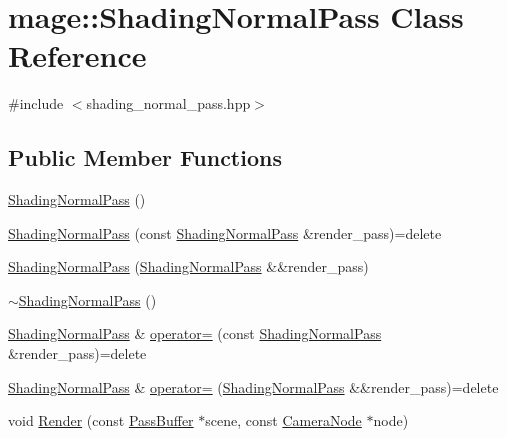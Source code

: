\hypertarget{classmage_1_1_shading_normal_pass}{}\section{mage\+:\+:Shading\+Normal\+Pass Class Reference}
\label{classmage_1_1_shading_normal_pass}


{\ttfamily \#include $<$shading\+\_\+normal\+\_\+pass.\+hpp$>$}

\subsection*{Public Member Functions}
\begin{DoxyCompactItemize}
\item 
\hyperlink{classmage_1_1_shading_normal_pass_a8d85834472875ce27cf3966b7c561d1f}{Shading\+Normal\+Pass} ()
\item 
\hyperlink{classmage_1_1_shading_normal_pass_ab13b45f9a3118f8494150d64ff06f94f}{Shading\+Normal\+Pass} (const \hyperlink{classmage_1_1_shading_normal_pass}{Shading\+Normal\+Pass} \&render\+\_\+pass)=delete
\item 
\hyperlink{classmage_1_1_shading_normal_pass_acc466f246daaf57ccace5aa8782f0799}{Shading\+Normal\+Pass} (\hyperlink{classmage_1_1_shading_normal_pass}{Shading\+Normal\+Pass} \&\&render\+\_\+pass)
\item 
\hyperlink{classmage_1_1_shading_normal_pass_aba7194077210d32dbcbc6cfbf4adba8f}{$\sim$\+Shading\+Normal\+Pass} ()
\item 
\hyperlink{classmage_1_1_shading_normal_pass}{Shading\+Normal\+Pass} \& \hyperlink{classmage_1_1_shading_normal_pass_afef400a6e3b00a43f6b6d3a3f34d43b7}{operator=} (const \hyperlink{classmage_1_1_shading_normal_pass}{Shading\+Normal\+Pass} \&render\+\_\+pass)=delete
\item 
\hyperlink{classmage_1_1_shading_normal_pass}{Shading\+Normal\+Pass} \& \hyperlink{classmage_1_1_shading_normal_pass_a25a9ba6a32a246176929f4de1a4adf0c}{operator=} (\hyperlink{classmage_1_1_shading_normal_pass}{Shading\+Normal\+Pass} \&\&render\+\_\+pass)=delete
\item 
void \hyperlink{classmage_1_1_shading_normal_pass_ac4c404dd4b54fee222f652c1556fb9bf}{Render} (const \hyperlink{structmage_1_1_pass_buffer}{Pass\+Buffer} $\ast$scene, const \hyperlink{classmage_1_1_camera_node}{Camera\+Node} $\ast$node)
\end{DoxyCompactItemize}

